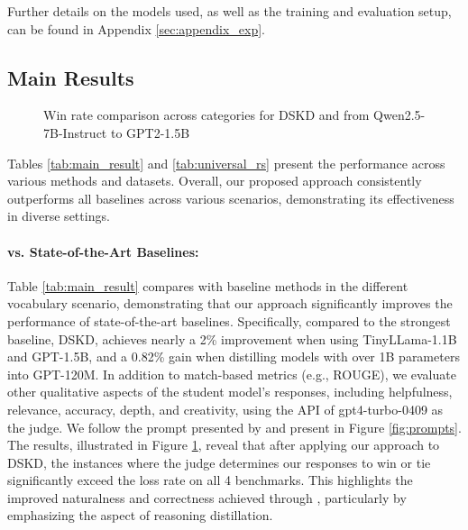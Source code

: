 Further details on the models used, as well as the training and evaluation setup, can be found in Appendix \ref{sec:appendix_exp}.

\subsection{Main Results}

\begin{figure}[t]
    \centering
    \caption{Win rate comparison across categories for DSKD and \method from Qwen2.5-7B-Instruct to GPT2-1.5B}
    \label{fig:win_rate_comparison}
\end{figure}

Tables \ref{tab:main_result} and \ref{tab:universal_rs} present the performance across various methods and datasets. Overall, our proposed approach consistently outperforms all baselines across various scenarios, demonstrating its effectiveness in diverse settings.



\paragraph{\method vs. State-of-the-Art Baselines:} Table \ref{tab:main_result} compares \method with baseline methods in the different vocabulary scenario, demonstrating that our approach significantly improves the performance of state-of-the-art baselines. Specifically, compared to the strongest baseline, DSKD, achieves nearly a 2\% improvement when using TinyLLama-1.1B and GPT-1.5B, and a 0.82\% gain when distilling models with over 1B parameters into GPT-120M. In addition to match-based metrics (e.g., ROUGE), we evaluate other qualitative aspects of the student model's responses, including helpfulness, relevance, accuracy, depth, and creativity, using the API of gpt4-turbo-0409 as the judge. We follow the prompt presented by \citet{zhang2024dual} and present in Figure \ref{fig:prompts}. The results, illustrated in Figure \ref{fig:win_rate_comparison}, reveal that after applying our approach to DSKD, the instances where the judge determines our responses to win or tie significantly exceed the loss rate on all 4 benchmarks. This highlights the improved naturalness and correctness achieved through \method, particularly by emphasizing the aspect of reasoning distillation.

